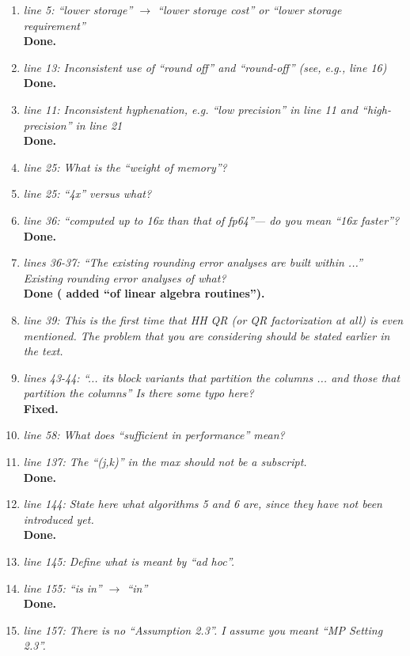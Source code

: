 \documentclass[final,onefignum,onetabnum]{siamart190516}
\begin{document}
\begin{enumerate}
    \item {\it line 5: ``lower storage'' $\rightarrow$ ``lower storage cost'' or ``lower storage requirement'' }\\
    {\bf Done.}
    \item {\it line 13: Inconsistent use of ``round off'' and ``round-off'' (see, e.g., line 16) }\\
    {\bf Done.}
    \item {\it line 11: Inconsistent hyphenation, e.g. ``low precision'' in line 11 and ``high-precision'' in line 21 }\\
    {\bf Done.}
    \item {\it line 25: What is the ``weight of memory''? }
    \item {\it line 25: ``4x'' versus what? }
    \item {\it line 36: ``computed up to 16x than that of fp64''--- do you mean ``16x faster''? }\\
    {\bf Done.}
    \item {\it lines 36-37: ``The existing rounding error analyses are built within ...'' Existing rounding error analyses of what? }\\
    {\bf Done ( added ``of linear algebra routines'').}
    \item {\it line 39: This is the first time that HH QR (or QR factorization at all) is even mentioned. The problem that you are considering should be stated earlier in the text. }
    \item {\it lines 43-44: ``... its block variants that partition the columns ... and those that partition the columns'' Is there some typo here? }\\
    {\bf Fixed.}
    \item {\it line 58: What does ``sufficient in performance'' mean? }
    \item {\it line 137: The ``(j,k)'' in the max should not be a subscript. }\\
    {\bf Done.}
    \item {\it line 144: State here what algorithms 5 and 6 are, since they have not been introduced yet. }\\
    {\bf Done.}
    \item {\it line 145: Define what is meant by ``ad hoc''. }
    \item {\it line 155: ``is in'' $\rightarrow $ ``in'' }\\
    {\bf Done.}
    \item {\it line 157: There is no ``Assumption 2.3''. I assume you meant ``MP Setting 2.3''. }\\

\end{enumerate}
\end{document}
